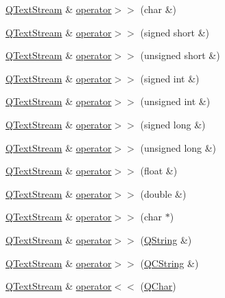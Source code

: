 \begin{DoxyCompactItemize}
\item 
\hyperlink{class_q_text_stream}{Q\-Text\-Stream} \& \hyperlink{class_q_text_stream_a1e326920add4b9104eeafbfc09b8612d}{operator$>$$>$} (char \&)
\item 
\hyperlink{class_q_text_stream}{Q\-Text\-Stream} \& \hyperlink{class_q_text_stream_acbd4027cbf46ccfa6690c795c0334e7b}{operator$>$$>$} (signed short \&)
\item 
\hyperlink{class_q_text_stream}{Q\-Text\-Stream} \& \hyperlink{class_q_text_stream_aee3072f51cdadcdec817f39525cee7b6}{operator$>$$>$} (unsigned short \&)
\item 
\hyperlink{class_q_text_stream}{Q\-Text\-Stream} \& \hyperlink{class_q_text_stream_a6481f84317a20bd875a873b4b9384217}{operator$>$$>$} (signed int \&)
\item 
\hyperlink{class_q_text_stream}{Q\-Text\-Stream} \& \hyperlink{class_q_text_stream_a767cb81e45f161bc74396cea1dc655bf}{operator$>$$>$} (unsigned int \&)
\item 
\hyperlink{class_q_text_stream}{Q\-Text\-Stream} \& \hyperlink{class_q_text_stream_a591ad90b736db5df245d909670b20e3e}{operator$>$$>$} (signed long \&)
\item 
\hyperlink{class_q_text_stream}{Q\-Text\-Stream} \& \hyperlink{class_q_text_stream_ad0dc49284885e47d7879f7ab68bde590}{operator$>$$>$} (unsigned long \&)
\item 
\hyperlink{class_q_text_stream}{Q\-Text\-Stream} \& \hyperlink{class_q_text_stream_afa4edcf5db6225140e7795d30c4f1148}{operator$>$$>$} (float \&)
\item 
\hyperlink{class_q_text_stream}{Q\-Text\-Stream} \& \hyperlink{class_q_text_stream_afdf131a2dd40928ee5d3b56b081604a1}{operator$>$$>$} (double \&)
\item 
\hyperlink{class_q_text_stream}{Q\-Text\-Stream} \& \hyperlink{class_q_text_stream_ae75eac90095feddb18bfb24af7530ac2}{operator$>$$>$} (char $\ast$)
\item 
\hyperlink{class_q_text_stream}{Q\-Text\-Stream} \& \hyperlink{class_q_text_stream_a8fb7027dce1d2ebdaab8839d3fbe2bf3}{operator$>$$>$} (\hyperlink{class_q_string}{Q\-String} \&)
\item 
\hyperlink{class_q_text_stream}{Q\-Text\-Stream} \& \hyperlink{class_q_text_stream_ab5d9a1c9743e92d48a7451dcd6db2204}{operator$>$$>$} (\hyperlink{class_q_c_string}{Q\-C\-String} \&)
\item 
\hyperlink{class_q_text_stream}{Q\-Text\-Stream} \& \hyperlink{class_q_text_stream_a3423bb9fca85a45430b0c02c0ac19eaf}{operator$<$$<$} (\hyperlink{class_q_char}{Q\-Char})

\end{DoxyCompactItemize}
